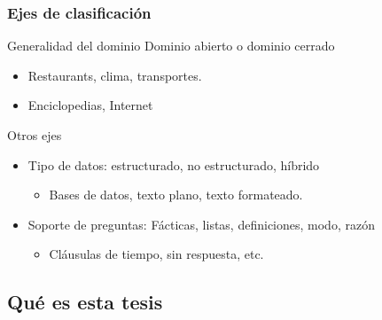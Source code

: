 \begin{frame}
  \frametitle{Ejes de clasificación}
  \begin{block}{Generalidad del dominio}
    Dominio abierto o dominio cerrado
    \begin{itemize} 
      \item Restaurants, clima, transportes.
      \item Enciclopedias, Internet
    \end{itemize}
  \end{block}


  \begin{block}{Otros ejes}
    \begin{itemize}
      \item Tipo de datos: estructurado, no estructurado, híbrido
      \begin{itemize}
          \item Bases de datos, texto plano, texto formateado.
      \end{itemize}
      \item Soporte de preguntas: Fácticas, listas, definiciones, modo, razón
      \begin{itemize}
          \item Cláusulas de tiempo, sin respuesta, etc.
      \end{itemize}
    \end{itemize}
  \end{block}
\end{frame}


\subsection{Qué es esta tesis}

